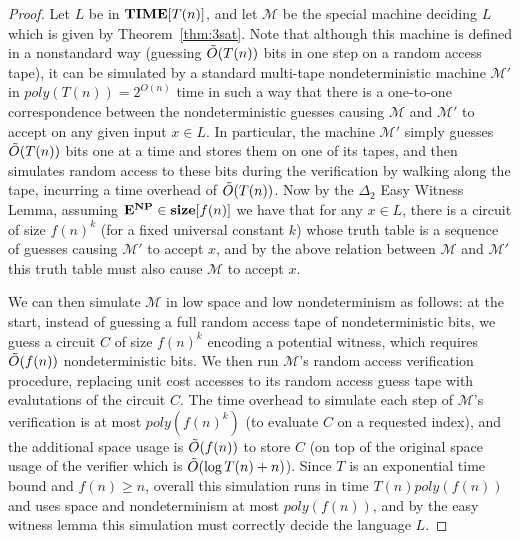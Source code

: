 \documentclass[11pt]{article}
\def\cl{\bf}
\begin{document}
\begin{proof}
Let $L$ be in ${\cl TIME}[T(n)]$, and let $\mathcal{M}$ be the special machine deciding $L$ which is given by Theorem~\ref{thm:3sat}. Note that although this machine is defined in a nonstandard way (guessing $\Tilde{O}(T(n))$ bits in one step on a random access tape), it can be simulated by a standard multi-tape nondeterministic machine $\mathcal{M}'$ in $poly(T(n)) = 2^{O(n)}$ time in such a way that there is a one-to-one correspondence between the nondeterministic guesses causing $\mathcal{M}$ and $\mathcal{M}'$ to accept on any given input $x \in L$. In particular, the machine $\mathcal{M}'$ simply guesses $\Tilde{O}(T(n))$ bits one at a time and stores them on one of its tapes, and then simulates random access to these bits during the verification by walking along the tape, incurring a time overhead of $\Tilde{O}(T(n))$. Now by the $\Delta_2$ Easy Witness Lemma, assuming ${\cl E}^{\cl NP} \in {\cl size}[f(n)]$ we have that for any $x \in L$, there is a circuit of size $f(n)^k$ (for a fixed universal constant $k$) whose truth table is a sequence of guesses causing $\mathcal{M}'$ to accept $x$, and by the above relation between $\mathcal{M}$ and $\mathcal{M}'$ this truth table must also cause $\mathcal{M}$ to accept $x$. 

We can then simulate $\mathcal{M}$ in low space and low nondeterminism as follows: at the start, instead of guessing a full random access tape of nondeterministic bits, we guess a circuit $C$ of size $f(n)^k$ encoding a potential witness, which requires $\Tilde{O}(f(n))$ nondeterministic bits. We then run $\mathcal{M}$'s random access verification procedure, replacing unit cost accesses to its random access guess tape with evalutations of the circuit $C$. The time overhead to simulate each step of $\mathcal{M}$'s verification is at most $poly(f(n)^k)$ (to evaluate $C$ on a requested index), and the additional space usage is $\Tilde{O}(f(n))$ to store $C$ (on top of the original space usage of the verifier which is $\Tilde{O}(\log T(n) + n)$). Since $T$ is an exponential time bound and $f(n) \geq n$, overall this simulation runs in time $T(n)poly(f(n))$ and uses space and nondeterminism at most $poly(f(n))$, and by the easy witness lemma this simulation must correctly decide the language $L$. 
\end{proof}
\end{document}
